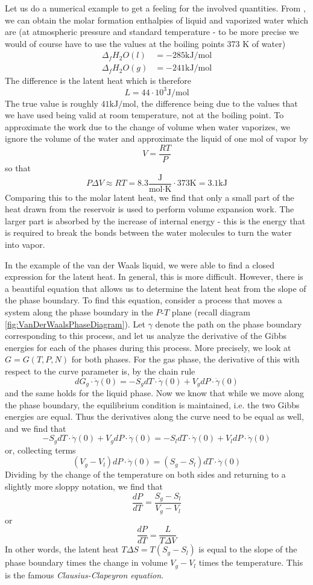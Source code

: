\documentclass[a4paper, draft]{article}
\theoremstyle{own}
\theoremstyle{remark}
\begin{document}
Let us do a numerical example to get a feeling for the involved quantities. From \cite{Tables}, we can obtain the molar formation enthalpies of liquid and vaporized water which are (at atmospheric pressure and standard temperature - to be more precise we would of course have to use the values at the boiling points 373 K of water)
\begin{align*}
\Delta_f H_2O (l) &= - 285 \text{kJ} / \text{mol}  \\
\Delta_f H_2O (g) &= - 241 \text{kJ} / \text{mol}  
\end{align*}
The difference is the latent heat which is therefore
$$
L = 44 \cdot 10^3 \text{J} / \text{mol}
$$
The true value is roughly $41  \text{kJ} / \text{mol}$, the difference being due to the values that we have used being valid at room temperature, not at the boiling point. To approximate the work due to the change of volume when water vaporizes, we ignore the volume of the water and approximate the liquid of one mol of vapor by
$$
V = \frac{RT}{P}
$$
so that
$$
P\Delta V \approx RT = 8.3 \frac{\text{J}}{\text{mol} \cdot \text{K}} \cdot 373 \text{K} = 3.1 \text{kJ}
$$
Comparing this to the molar latent heat, we find that only a small part of the heat drawn from the reservoir is used to perform volume expansion work. The larger part is absorbed by the increase of internal energy - this is the energy that is required to break the bonds between the water molecules to turn the water into vapor.

In the example of the van der Waals liquid, we were able to find a closed expression for the latent heat. In general, this is more difficult. However, there is a beautiful equation that allows us to determine the latent heat from the slope of the phase boundary. To find this equation, consider a process that moves a system along the phase boundary in the $P$-$T$ plane (recall  diagram \ref{fig:VanDerWaalsPhaseDiagram}). Let $\gamma$ denote the path on the phase boundary corresponding to this process, and let us analyze the derivative of the Gibbs energies for each of the phases during this process. More precisely, we look at $G = G(T, P, N)$ for both phases. For the gas phase, the derivative of this with respect to the curve parameter is, by the chain rule
$$
d G_g \cdot \dot{\gamma}(0) = - S_g dT \cdot \dot{\gamma}(0)  + V_g dP  \cdot \dot{\gamma}(0)  
$$
and the same holds for the liquid phase. Now we know that while we move along the phase boundary, the equilibrium condition is maintained, i.e. the two Gibbs energies are equal. Thus the derivatives along the curve need to be equal as well, and we find that
$$
- S_g dT \cdot \dot{\gamma}(0)  + V_g dP  \cdot \dot{\gamma}(0)   = - S_l dT \cdot \dot{\gamma}(0)  + V_l dP  \cdot \dot{\gamma}(0)  
$$
or, collecting terms
$$
(V_g  - V_l) dP  \cdot \dot{\gamma}(0)   = (S_g - S_l) dT \cdot \dot{\gamma}(0)
$$
Dividing by the change of the temperature on both sides and returning to a slightly more sloppy notation, we find that
$$
\frac{dP}{dT} = \frac{S_g - S_l}{V_g - V_l} 
$$
or
$$
\frac{dP}{dT} = \frac{L}{T \Delta V} 
$$
In other words, the latent heat $T \Delta S = T (S_g - S_l)$ is equal to the slope of the phase boundary times the change in volume $V_g - V_l$ times the temperature. This is the famous {\em Clausius-Clapeyron equation}. 
\end{document}
